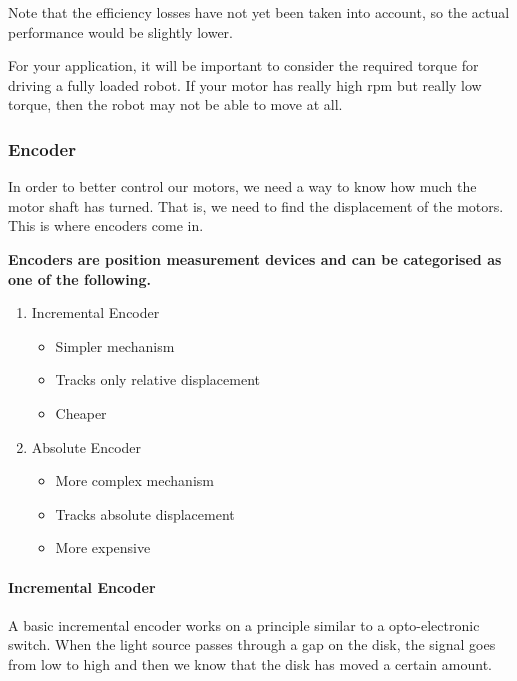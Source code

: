 \documentclass[paper=a4, fontsize=11pt]{article} %
\providecommand{\tightlist}{%
  \setlength{\itemsep}{0pt}\setlength{\parskip}{0pt}}
\numberwithin{equation}{section} %
\numberwithin{figure}{section} %
\numberwithin{table}{section} %
\begin{document}
Note that the efficiency losses have not yet been taken into account, so
the actual performance would be slightly lower.

For your application, it will be important to consider the required
torque for driving a fully loaded robot. If your motor has really high
rpm but really low torque, then the robot may not be able to move at
all.

\hypertarget{encoder}{%
\subsubsection{Encoder}\label{encoder}}

In order to better control our motors, we need a way to know how much
the motor shaft has turned. That is, we need to find the displacement of
the motors. This is where encoders come in.

\textbf{Encoders are position measurement devices and can be categorised
as one of the following.}

\begin{enumerate}
\def\labelenumi{\arabic{enumi}.}
\tightlist
\item
  Incremental Encoder

  \begin{itemize}
  \tightlist
  \item
    Simpler mechanism
  \item
    Tracks only relative displacement
  \item
    Cheaper
  \end{itemize}
\item
  Absolute Encoder

  \begin{itemize}
  \tightlist
  \item
    More complex mechanism
  \item
    Tracks absolute displacement
  \item
    More expensive
  \end{itemize}
\end{enumerate}

\hypertarget{incremental-encoder}{%
\paragraph{Incremental Encoder}\label{incremental-encoder}}

A basic incremental encoder works on a principle similar to a
opto-electronic switch. When the light source passes through a gap on
the disk, the signal goes from low to high and then we know that the
disk has moved a certain amount.
\end{document}
